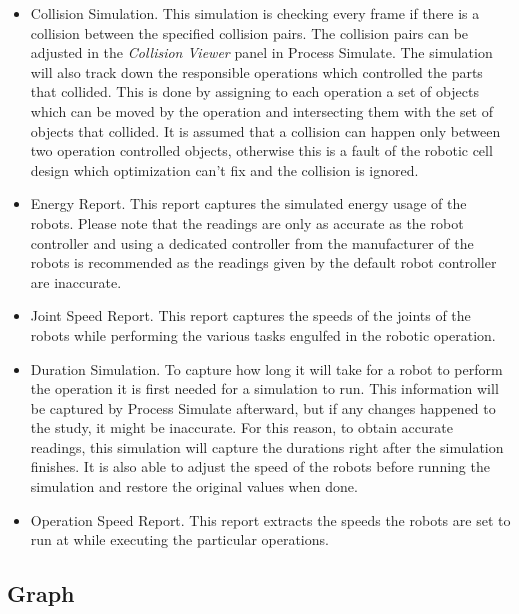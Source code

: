 \begin{itemize}

\item Collision Simulation. This simulation is checking every frame if there is a collision between the specified collision pairs. The collision pairs can be adjusted in the \emph{Collision Viewer} panel in Process Simulate. The simulation will also track down the responsible operations which controlled the parts that collided. This is done by assigning to each operation a set of objects which can be moved by the operation and intersecting them with the set of objects that collided. It is assumed that a collision can happen only between two operation controlled objects, otherwise this is a fault of the robotic cell design which optimization can't fix and the collision is ignored.

\item Energy Report. This report captures the simulated energy usage of the robots. Please note that the readings are only as accurate as the robot controller and using a dedicated controller from the manufacturer of the robots is recommended as the readings given by the default robot controller are inaccurate.

\item Joint Speed Report. This report captures the speeds of the joints of the robots while performing the various tasks engulfed in the robotic operation.

\item Duration Simulation. To capture how long it will take for a robot to perform the operation it is first needed for a simulation to run. This information will be captured by Process Simulate afterward, but if any changes happened to the study, it might be inaccurate. For this reason, to obtain accurate readings, this simulation will capture the durations right after the simulation finishes. It is also able to adjust the speed of the robots before running the simulation and restore the original values when done. 

\item Operation Speed Report. This report extracts the speeds the robots are set to run at while executing the particular operations. 

\end{itemize}

\subsection{Graph}

